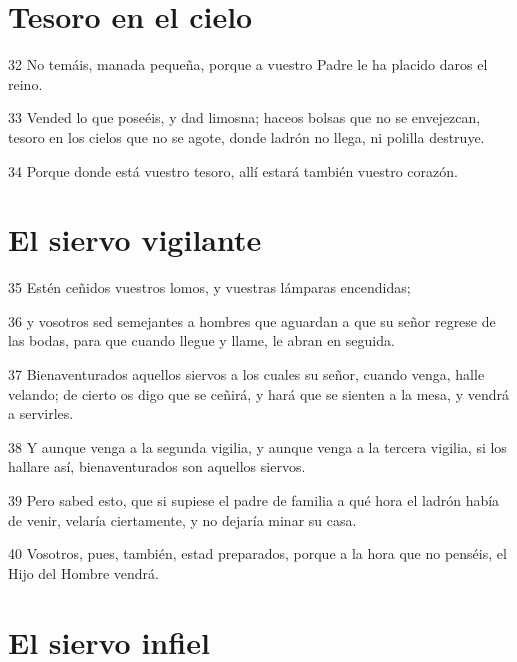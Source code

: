 \section*{Tesoro en el cielo}

\par 32 No temáis, manada pequeña, porque a vuestro Padre le ha placido daros el reino.
\par 33 Vended lo que poseéis, y dad limosna; haceos bolsas que no se envejezcan, tesoro en los cielos que no se agote, donde ladrón no llega, ni polilla destruye.
\par 34 Porque donde está vuestro tesoro, allí estará también vuestro corazón.

\section*{El siervo vigilante}

\par 35 Estén ceñidos vuestros lomos, y vuestras lámparas encendidas;
\par 36 y vosotros sed semejantes a hombres que aguardan a que su señor regrese de las bodas, para que cuando llegue y llame, le abran en seguida.
\par 37 Bienaventurados aquellos siervos a los cuales su señor, cuando venga, halle velando; de cierto os digo que se ceñirá, y hará que se sienten a la mesa, y vendrá a servirles.
\par 38 Y aunque venga a la segunda vigilia, y aunque venga a la tercera vigilia, si los hallare así, bienaventurados son aquellos siervos.
\par 39 Pero sabed esto, que si supiese el padre de familia a qué hora el ladrón había de venir, velaría ciertamente, y no dejaría minar su casa.
\par 40 Vosotros, pues, también, estad preparados, porque a la hora que no penséis, el Hijo del Hombre vendrá.

\section*{El siervo infiel}

